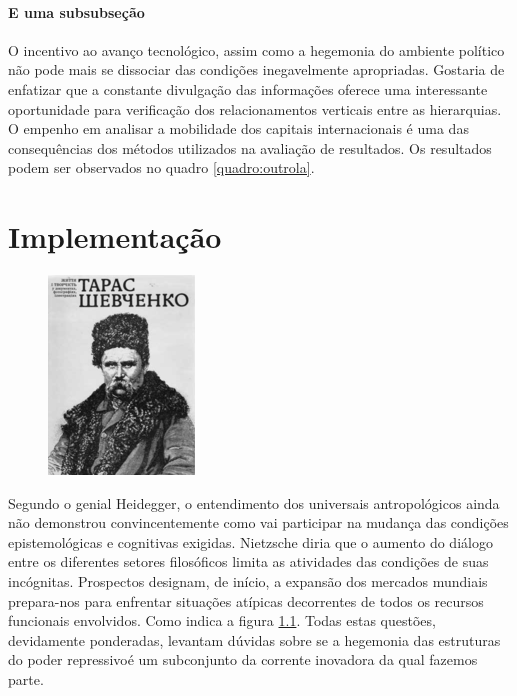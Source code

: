 \documentclass[font=plain,chapter=TITLE,section=Title,espaco=duplo,tocpage=plain,appendix=Name,floatnumber=continuous]{abnt}
\begin{document}
\subsubsection{E uma subsubseção}

O incentivo ao avanço tecnológico, assim como a hegemonia do ambiente político
não pode mais se dissociar das condições inegavelmente apropriadas. Gostaria de
enfatizar que a constante divulgação das informações oferece uma interessante
oportunidade para verificação dos relacionamentos verticais entre as
hierarquias. O empenho em analisar a mobilidade dos capitais internacionais é
uma das consequências dos métodos utilizados na avaliação de resultados. Os
resultados podem ser observados no quadro \ref{quadro:outrola}.

\chapter{Implementação}

\begin{figure}[h!]
  \centering
  \includegraphics{img/taras.png}
  \label{fig:shevchenko}
\end{figure}

Segundo o genial Heidegger, o entendimento dos universais antropológicos
ainda não demonstrou convincentemente como vai participar na mudança das
condições epistemológicas e cognitivas exigidas. Nietzsche diria que o
aumento do diálogo entre os diferentes setores filosóficos limita as
atividades das condições de suas incógnitas. Prospectos designam, de
início, a expansão dos mercados mundiais prepara-nos para enfrentar
situações atípicas decorrentes de todos os recursos funcionais envolvidos.
Como indica a figura \ref{fig:shevchenko}. Todas estas questões,
devidamente ponderadas, levantam dúvidas sobre se a hegemonia das
estruturas do poder repressivoé um subconjunto da corrente inovadora da
qual fazemos parte.
\end{document}
